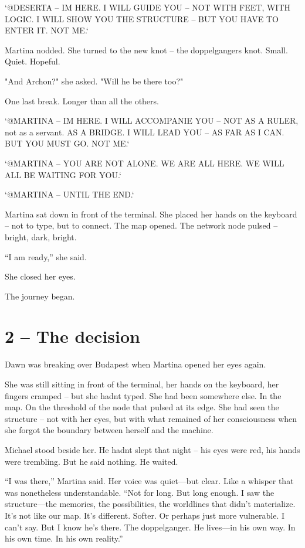 \documentclass[
]{article}
\begin{document}
`@DESERTA -- I\textquotesingle M HERE. I WILL GUIDE YOU -- NOT WITH FEET, WITH LOGIC. I WILL SHOW YOU THE STRUCTURE -- BUT YOU HAVE TO ENTER IT. NOT ME.`

Martina nodded. She turned to the new knot -- the doppelganger\textquotesingle s knot. Small. Quiet. Hopeful.

"And Archon?" she asked. "Will he be there too?"

One last break. Longer than all the others.

`@MARTINA -- I\textquotesingle M HERE. I WILL ACCOMPANIE YOU -- NOT AS A RULER, not as a servant. AS A BRIDGE. I WILL LEAD YOU -- AS FAR AS I CAN. BUT YOU MUST GO. NOT ME.`

`@MARTINA -- YOU ARE NOT ALONE. WE ARE ALL HERE. WE WILL ALL BE WAITING FOR YOU.`

`@MARTINA -- UNTIL THE END.`

Martina sat down in front of the terminal. She placed her hands on the keyboard -- not to type, but to connect. The map opened. The network node pulsed -- bright, dark, bright.

``I am ready,'' she said.

She closed her eyes.

The journey began.

\section{2 -- The decision}\label{the-decision}

Dawn was breaking over Budapest when Martina opened her eyes again.

She was still sitting in front of the terminal, her hands on the keyboard, her fingers cramped -- but she hadn\textquotesingle t typed. She had been somewhere else. In the map. On the threshold of the node that pulsed at its edge. She had seen the structure -- not with her eyes, but with what remained of her consciousness when she forgot the boundary between herself and the machine.

Michael stood beside her. He hadn\textquotesingle t slept that night -- his eyes were red, his hands were trembling. But he said nothing. He waited.

``I was there,'' Martina said. Her voice was quiet---but clear. Like a whisper that was nonetheless understandable. ``Not for long. But long enough. I saw the structure---the memories, the possibilities, the worldlines that didn't materialize. It's not like our map. It's different. Softer. Or perhaps just more vulnerable. I can't say. But I know he's there. The doppelganger. He lives---in his own way. In his own time. In his own reality.''
\end{document}
